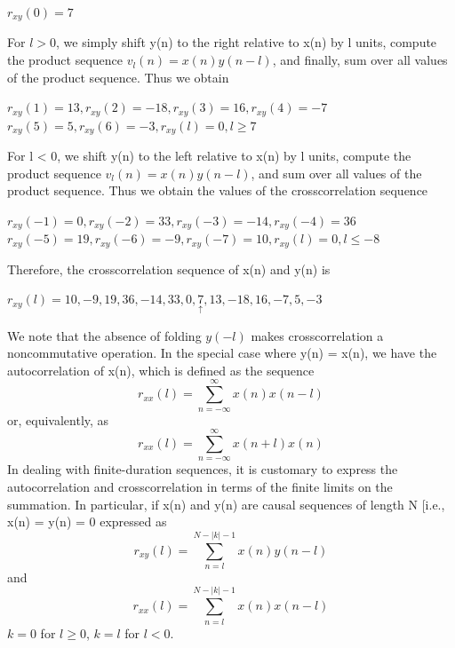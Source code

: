 \documentclass{article}
\begin{document}
\begin{center}
    $r_{xy}(0) =7$
\end{center}
For $l > 0$, we simply shift y(n) to the right relative to x(n) by l units, compute the product
sequence $v_l(n) = x(n)y(n - l)$, and finally, sum over all values of the product sequence. Thus
we obtain
\begin{center}
    $r_{xy} (1) = 13, r_{xy} (2) = -18, r_{xy} (3) = 16, r_{xy} (4) = -7$ \\
    $r_{xy} (5) = 5, r_{xy} (6) = -3, r_{xy} (l) = 0, l \geq 7$
\end{center}
For l < 0, we shift y(n) to the left relative to x(n) by l units, compute the product
sequence $v_l(n) = x(n)y(n - l)$, and sum over all values of the product sequence. Thus we
obtain the values of the crosscorrelation sequence
\begin{center}
    $r_{xy} (-1) = 0, r_{xy} (-2) = 33, r_{xy} (-3) = -14, r_{xy} (-4) = 36$ \\
    $r_{xy} (-5) = 19, r_{xy} (-6) = -9, r_{xy} (-7) = 10,r_{xy} (l) = 0, l \leq -8$
\end{center}
Therefore, the crosscorrelation sequence of x(n) and y(n) is
\begin{center}
    $r_{xy}(l) = {10, -9, 19, 36, -14, 33, 0, \underset{\uparrow}{7}, 13, -18, 16, -7, 5, -3}$
\end{center}
We note that the absence of folding $y(-l)$ makes crosscorrelation a noncommutative
operation. In the special case where y(n) = x(n), we have the autocorrelation of
x(n), which is defined as the sequence
\begin{equation}
    r_{xx}(l) = \sum_{n=-\infty}^{\infty}x(n)x(n-l)
\end{equation}
or, equivalently, as
\begin{equation}
    r_{xx}(l) = \sum_{n=-\infty}^{\infty}x(n+l)x(n)
\end{equation}
In dealing with finite-duration sequences, it is customary to express the autocorrelation and crosscorrelation in terms of the finite limits on the summation. In
particular, if x(n) and y(n) are causal sequences of length N [i.e., x(n) = y(n) = 0
expressed as
\begin{equation}
    r_{xy}(l) = \sum_{n=l}^{N-|k|-1}x(n)y(n-l)
\end{equation}
and
\begin{equation}
    r_{xx}(l) = \sum_{n=l}^{N-|k|-1}x(n)x(n-l)
\end{equation}
$k = 0$ for $l \geq 0$, $k = l$ for $l < 0$.
\end{document}
